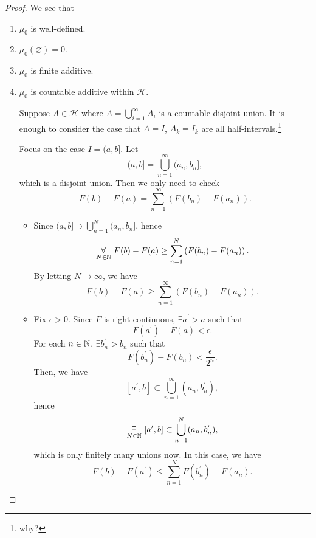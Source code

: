 \begin{proof}
	We see that
	\begin{enumerate}
		\item \(\mu _0\) is well-defined.
		\item \(\mu _0(\varnothing ) = 0\).
		\item \(\mu _0\) is finite additive.
		\item \(\mu _0\) is countable additive within \(\mathcal{H}\).
		      \par Suppose \(A\in \mathcal{H} \) where \(A = \bigcup\limits_{i=1}^{\infty} A_{i}\) is a countable
		      disjoint union. It is enough to consider the case that \(A = I\), \(A_{k} = I_{k}\) are all
		      half-intervals.\footnote{why?}

		      Focus on the case \(I = (a, b]\). Let
		      \[
			      (a, b] = \bigcup\limits_{n=1}^{\infty} (a_{n}, b_{n}],
		      \]
		      which is a disjoint union. Then we only need to check
		      \[
			      F(b) - F(a) = \sum\limits_{n=1}^{\infty} \left(F(b_{n}) - F(a_{n})\right).
		      \]
		      \begin{itemize}
			      \item Since \((a, b]\supset \bigcup\limits_{n=1}^{N} (a_{n}, b_{n}]\), hence
			            \[
				            \underset{N\in\mathbb{\MakeUppercase{N}} }{\forall}\ F(b) - F(a) \geq \sum\limits_{n=1}^{N} \left(F(b_{n}) - F(a_{n})\right).
			            \]
			            By letting \(N \to \infty\), we have
			            \[
				            F(b) - F(a) \geq \sum\limits_{n=1}^{\infty} \left(F(b_{n}) - F(a_{n})\right).
			            \]
			      \item Fix \(\epsilon >0\). Since \(F\) is right-continuous, \(\exists a ^\prime > a\) such that
			            \[
				            F(a ^\prime ) - F(a) <\epsilon.
			            \]
			            For each \(n\in\mathbb{\MakeUppercase{N}} \), \(\exists b_{n} ^\prime > b_{n}\) such that
			            \[
				            F(b_{n} ^\prime ) - F(b_{n})<\frac{\epsilon }{2^n}.
			            \]
			            Then, we have
			            \[
				            [a ^\prime , b] \subset \bigcup\limits_{n=1}^{\infty} (a_{n}, b_{n} ^\prime ),
			            \]
			            hence
			            \[
				            \underset{ N\in\mathbb{\MakeUppercase{N}}}{\exists}\ [a ^\prime , b]\subset \bigcup\limits_{n=1}^{N} (a_{n}, b_{n} ^\prime ),
			            \]
			            which is only finitely many unions now. In this case, we have
			            \[
				            F(b) - F(a ^\prime ) \leq \sum\limits_{n=1}^{N} F(b_{n} ^\prime ) - F(a_{n}).
			            \]


\end{itemize}
\end{enumerate}
\end{proof}
